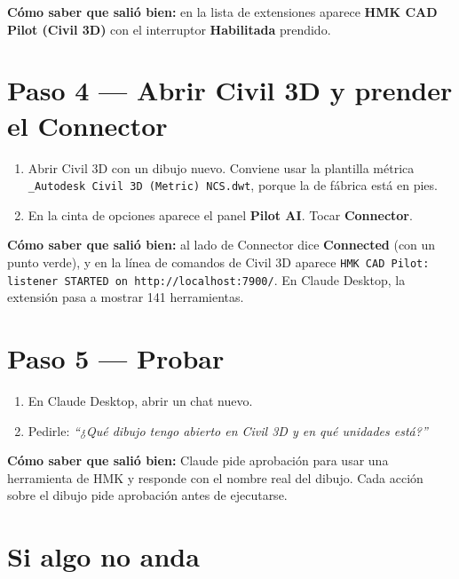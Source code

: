 \documentclass[12pt, a4paper]{article}
\begin{document}
\textbf{Cómo saber que salió bien:} en la lista de extensiones aparece \textbf{HMK CAD Pilot
(Civil 3D)} con el interruptor \textbf{Habilitada} prendido.

\section*{Paso 4 --- Abrir Civil 3D y prender el Connector}

\begin{enumerate}[itemsep=2pt]
  \item Abrir Civil 3D con un dibujo nuevo. Conviene usar la plantilla métrica
  \texttt{\_Autodesk Civil 3D (Metric) NCS.dwt}, porque la de fábrica está en pies.
  \item En la cinta de opciones aparece el panel \textbf{Pilot AI}. Tocar \textbf{Connector}.
\end{enumerate}

\textbf{Cómo saber que salió bien:} al lado de Connector dice \textbf{Connected} (con un punto
verde), y en la línea de comandos de Civil 3D aparece
\texttt{HMK CAD Pilot: listener STARTED on http://localhost:7900/}. En Claude Desktop, la
extensión pasa a mostrar 141 herramientas.

\section*{Paso 5 --- Probar}

\begin{enumerate}[itemsep=2pt]
  \item En Claude Desktop, abrir un chat nuevo.
  \item Pedirle: \textit{``¿Qué dibujo tengo abierto en Civil 3D y en qué unidades está?''}
\end{enumerate}

\textbf{Cómo saber que salió bien:} Claude pide aprobación para usar una herramienta de HMK y
responde con el nombre real del dibujo. Cada acción sobre el dibujo pide aprobación antes de
ejecutarse.

\section*{Si algo no anda}
\end{document}
